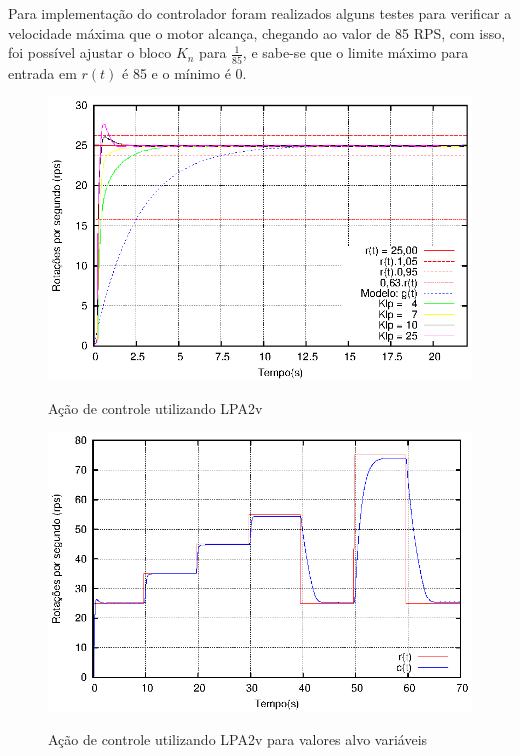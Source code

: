 Para implementação do controlador foram realizados alguns testes 
para verificar a velocidade máxima que o motor alcança, 
chegando ao valor de 85 RPS, com isso, 
foi possível ajustar o bloco $K_n$ para $\frac{1}{85}$, 
e sabe-se que o limite máximo para entrada em $r(t)$ é 85 e o mínimo é 0.










\begin{figure}[!htb]
\caption{Ação de controle utilizando LPA2v}
\vspace{-1cm}\center\includegraphics[scale=1.6]{./imagens/klpAll.eps}
\label{fig:acaoLPA2v}
\end{figure}

\begin{figure}[!htb]
\caption{Ação de controle utilizando LPA2v para valores alvo variáveis}
\vspace{-1cm}
\center\includegraphics[scale=1.4]{./imagens/patam85.eps}
\label{fig:acaoLPA2vpatam85}
\end{figure}








